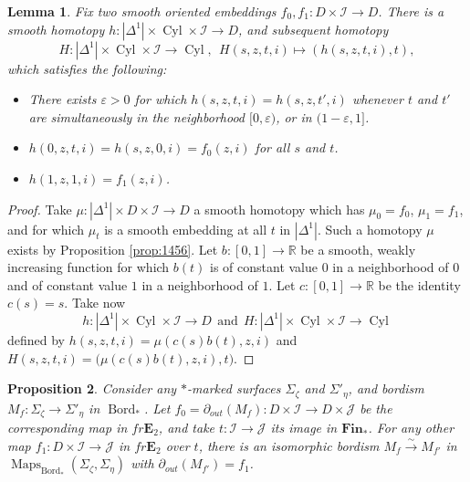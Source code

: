 \documentclass[reqno]{amsart}
\newtheorem{lemma}{Lemma}[section]
\newtheorem{proposition}[lemma]{Proposition}
\theoremstyle{definition}
\newcommand{\mcl}[1]{\mathcal{#1}}
\newcommand{\mbf}[1]{\mathbf{#1}}
\newcommand{\opn}[1]{\operatorname{#1}}
\newcommand{\E}{\mathbf{E}}
\DeclareMathOperator{\Maps}{Maps}
\DeclareMathOperator{\Bord}{Bord}
\renewcommand{\1}{\mathbf{1}}
\begin{document}
\begin{lemma}\label{lem:1939}
Fix two smooth oriented embeddings $f_0,f_1:D\times \mcl{I}\to D$.  There is a smooth homotopy $h:|\Delta^1|\times \opn{Cyl}\times \mcl{I}\to D$, and subsequent homotopy
\[
H:|\Delta^1|\times \opn{Cyl}\times \mcl{I}\to \opn{Cyl},\ \ H(s,z,t,i)\mapsto (h(s,z,t,i),t),
\]
which satisfies the following:
\begin{itemize}
\item There exists $\varepsilon>0$ for which $h(s,z,t,i)=h(s,z,t',i)$ whenever $t$ and $t'$ are simultaneously in the neighborhood $[0,\varepsilon)$, or in $(1-\varepsilon,1]$.\vspace{1mm}
\item $h(0,z,t,i)=h(s,z,0,i)=f_0(z,i)$ for all $s$ and $t$.\vspace{1mm}
\item $h(1,z,1,i)=f_1(z,i)$.
\end{itemize}
\end{lemma}

\begin{proof}
Take $\mu:|\Delta^1|\times D\times \mcl{I}\to D$ a smooth homotopy which has $\mu_0=f_0$, $\mu_1=f_1$, and for which $\mu_t$ is a smooth embedding at all $t$ in $|\Delta^1|$.  Such a homotopy $\mu$ exists by Proposition \ref{prop:1456}. Let $b:[0,1]\to \mathbb{R}$ be a smooth, weakly increasing function for which $b(t)$ is of constant value $0$ in a neighborhood of $0$ and of constant value $1$ in a neighborhood of $1$.  Let $c:[0,1]\to \mathbb{R}$ be the identity $c(s)=s$. Take now
\[
h:|\Delta^1|\times \opn{Cyl}\times \mcl{I}\to D\ \ \text{and}\ \ H:|\Delta^1|\times \opn{Cyl}\times \mcl{I}\to \opn{Cyl}
\]
defined by $h(s,z,t,i)=\mu(c(s)b(t),z,i)$ and $H(s,z,t,i)=\Big(\mu(c(s)b(t),z,i),t\Big)$.
\end{proof}

\begin{proposition}\label{prop:whatever}
Consider any $\ast$-marked surfaces $\Sigma_{\zeta}$ and $\Sigma'_{\eta}$, and bordism $M_f:\Sigma_{\zeta}\to \Sigma'_{\eta}$ in $\Bord_{\ast}$.  Let $f_0=\partial_{out}(M_f):D\times \mcl{I}\to D\times \mcl{J}$ be the corresponding map in $fr\E_2$, and take $t:\mcl{I}\to \mcl{J}$ its image in $\mbf{Fin}_{\ast}$.  For any other map $f_1:D\times\mcl{I}\to \mcl{J}$ in $fr\E_2$ over $t$, there is an isomorphic bordism $M_f\overset{\sim}\to M_{f'}$ in $\Maps_{\Bord_{\ast}}(\Sigma_{\zeta},\Sigma_{\eta})$ with $\partial_{out}(M_{f'})=f_1$.
\end{proposition}
\end{document}
